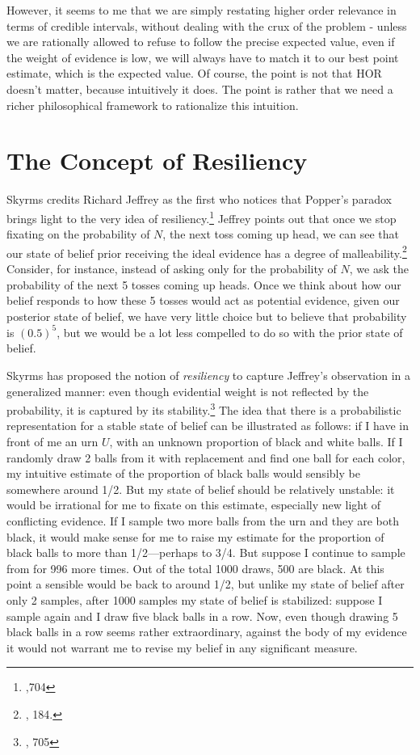 However, it seems to me that we are simply restating higher order
relevance in terms of credible intervals, without dealing with the crux
of the problem - unless we are rationally allowed to refuse to follow
the precise expected value, even if the weight of evidence is low, we
will always have to match it to our best point estimate, which is the
expected value. Of course, the point is not that HOR doesn't matter,
because intuitively it does. The point is rather that we need a richer
philosophical framework to rationalize this intuition.

\hypertarget{the-concept-of-resiliency-1}{%
\section{The Concept of
Resiliency}\label{the-concept-of-resiliency-1}}

Skyrms credits Richard Jeffrey as the first who notices that Popper's
paradox brings light to the very idea of resiliency.\footnote{\cite{causationandconditional},704} Jeffrey points out
that once we stop fixating on the probability of \(N\), the next toss
coming up head, we can see that our state of belief prior receiving the
ideal evidence has a degree of malleability.\footnote{\cite{jeffreydecision}, 184.} Consider, for instance, instead of
asking only for the probability of \(N\), we ask the probability of the
next 5 tosses coming up heads. Once we think about how our belief
responds to how these 5 tosses would act as potential evidence, given
our posterior state of belief, we have very little choice but to believe
that probability is \((0.5)^5\), but we would be a lot less compelled to
do so with the prior state of belief.

Skyrms has proposed the notion of \emph{resiliency} to capture Jeffrey's
observation in a generalized manner: even though evidential weight is
not reflected by the probability, it is captured by its stability.\footnote{\cite{causationandconditional}, 705} The
idea that there is a probabilistic representation for a stable state of
belief can be illustrated as follows: if I have in front of me an urn
\(U\), with an unknown proportion of black and white balls. If I
randomly draw 2 balls from it with replacement and find one ball for
each color, my intuitive estimate of the proportion of black balls would
sensibly be somewhere around 1/2. But my state of belief should be
relatively unstable: it would be irrational for me to fixate on this
estimate, especially new light of conflicting evidence. If I sample two
more balls from the urn and they are both black, it would make sense for
me to raise my estimate for the proportion of black balls to more than
1/2---perhaps to 3/4. But suppose I continue to sample from for 996 more
times. Out of the total 1000 draws, 500 are black. At this point a
sensible would be back to around 1/2, but unlike my state of belief
after only 2 samples, after 1000 samples my state of belief is
stabilized: suppose I sample again and I draw five black balls in a row.
Now, even though drawing 5 black balls in a row seems rather
extraordinary, against the body of my evidence it would not warrant me
to revise my belief in any significant measure.

